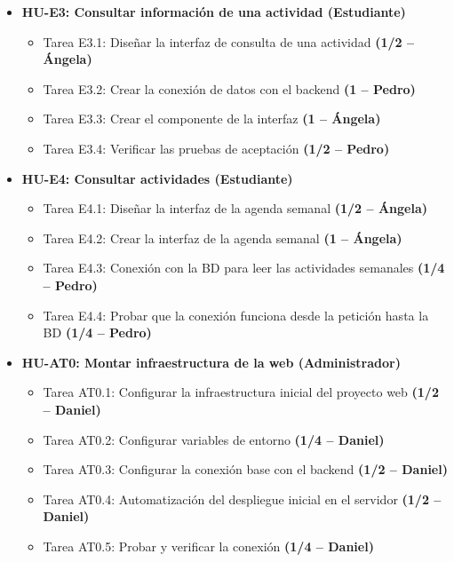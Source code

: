 \begin{itemize}[leftmargin=1.2em, itemsep=4pt]
    \item \textbf{HU-E3: Consultar información de una actividad (Estudiante)}
    \begin{itemize}[label=$\circ$, leftmargin=1.5em, itemsep=2pt]
        \item \textsf{Tarea E3.1:} Diseñar la interfaz de consulta de una actividad \hfill \textbf{(1/2 -- Ángela)}
        \item \textsf{Tarea E3.2:} Crear la conexión de datos con el backend \hfill \textbf{(1  -- Pedro)}
        \item \textsf{Tarea E3.3:} Crear el componente de la interfaz \hfill \textbf{(1  -- Ángela)}
        \item \textsf{Tarea E3.4:} Verificar las pruebas de aceptación \hfill \textbf{(1/2 -- Pedro)}
    \end{itemize}

    \item \textbf{HU-E4: Consultar actividades (Estudiante)}
    \begin{itemize}[label=$\circ$, leftmargin=1.5em, itemsep=2pt]
        \item \textsf{Tarea E4.1:} Diseñar la interfaz de la agenda semanal \hfill \textbf{(1/2 -- Ángela)}
        \item \textsf{Tarea E4.2:} Crear la interfaz de la agenda semanal \hfill \textbf{(1  -- Ángela)}
        \item \textsf{Tarea E4.3:} Conexión con la BD para leer las actividades semanales \hfill \textbf{(1/4 -- Pedro)}
        \item \textsf{Tarea E4.4:} Probar que la conexión funciona desde la petición hasta la BD \hfill \textbf{(1/4 -- Pedro)}
    \end{itemize}

    \item \textbf{HU-AT0: Montar infraestructura de la web (Administrador)}
    \begin{itemize}[label=$\circ$, leftmargin=1.5em, itemsep=2pt]
        \item \textsf{Tarea AT0.1:} Configurar la infraestructura inicial del proyecto web \hfill \textbf{(1/2 -- Daniel)}
        \item \textsf{Tarea AT0.2:} Configurar variables de entorno \hfill \textbf{(1/4 -- Daniel)}
        \item \textsf{Tarea AT0.3:} Configurar la conexión base con el backend \hfill \textbf{(1/2 -- Daniel)}
        \item \textsf{Tarea AT0.4:} Automatización del despliegue inicial en el servidor \hfill \textbf{(1/2 -- Daniel)}
        \item \textsf{Tarea AT0.5:} Probar y verificar la conexión \hfill \textbf{(1/4 -- Daniel)}
    \end{itemize}


\end{itemize}
